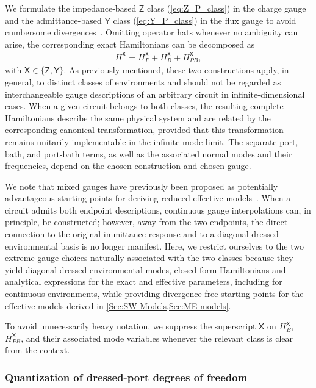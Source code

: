 \documentclass[prx,aps,twocolumn,article]{revtex4-2}
\newcommand{\msf}[1]{\mathsf{#1}}
\newcommand{\msY}{\msf{Y}}
\newcommand{\msZ}{\msf{Z}}
\newcommand{\msX}{\msf{X}}
\begin{document}
We formulate the impedance-based $\msZ$ class (\ref{eq:Z_P_class}) in the charge gauge and the admittance-based $\msY$ class (\ref{eq:Y_P_class}) in the flux gauge to avoid cumbersome divergences~\cite{CaldeiraLeggett_QT:1983,Esteve:1986,Mehta:2022}. Omitting operator hats whenever no ambiguity can arise, the corresponding exact Hamiltonians can be decomposed as
\begin{align}
H^{\msX}
=
H_P^{\msX}
+
H_B^{\msX}
+
H_{PB}^{\msX},
\label{Eq:ExactHamiltonianDecomposition}
\end{align}
with $\msX\in\{\msZ,\msY\}$. As previously mentioned, these two constructions apply, in general, to distinct classes of environments and should not be regarded as interchangeable gauge descriptions of an arbitrary circuit in infinite-dimensional cases. When a given circuit belongs to both classes, the resulting complete Hamiltonians describe the same physical system and are related by the corresponding canonical transformation, provided that this transformation remains unitarily implementable in the infinite-mode limit. The separate port, bath, and port-bath terms, as well as the associated normal modes and their frequencies, depend on the chosen construction and chosen gauge. 

We note that mixed gauges have previously been proposed as potentially advantageous starting points for deriving reduced effective  models~\cite{Roth:2019,Mehta:2022,Arwas:2023}. When a circuit admits both endpoint descriptions, continuous gauge interpolations can, in principle, be constructed; however, away from the two endpoints, the direct connection to the original immittance response and to a diagonal dressed environmental basis is no longer manifest. Here, we restrict ourselves to the two extreme gauge choices naturally associated with the two classes because they yield diagonal dressed environmental modes, closed-form Hamiltonians and analytical expressions for the exact and effective parameters, including for continuous environments, while providing divergence-free starting points for the effective models derived in \cref{Sec:SW-Models,Sec:ME-models}.

To avoid unnecessarily heavy notation, we suppress the superscript $\msX$ on $H_B^{\msX}$, $H_{PB}^{\msX}$, and their associated mode variables whenever the relevant class is clear from the context.


\subsubsection{Quantization of dressed-port degrees of freedom}
\end{document}
